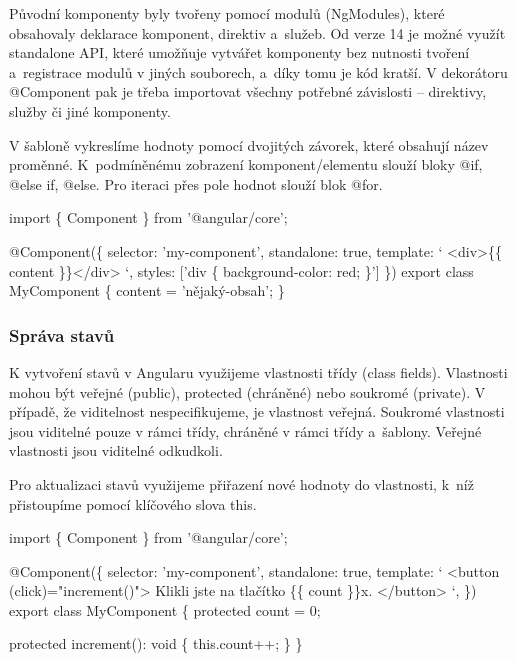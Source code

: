 Původní komponenty byly tvořeny pomocí modulů (NgModules), které obsahovaly deklarace komponent, direktiv a~služeb. 
Od verze 14 je možné využít standalone API, které umožňuje vytvářet komponenty bez nutnosti tvoření a~registrace modulů v jiných souborech, a~díky tomu je kód kratší. 
V dekorátoru @Component pak je třeba importovat všechny potřebné závislosti -- direktivy, služby či jiné komponenty.\cite{angulardev,learningangular}

V šabloně vykreslíme hodnoty pomocí dvojitých závorek, které obsahují název proměnné. K~podmíněnému zobrazení komponent/elementu slouží bloky @if, @else if, @else. 
Pro iteraci přes pole hodnot slouží blok @for.\cite{angulardev}

\begin{prog}
import \{ Component \} from '@angular/core';

@Component(\{
  selector: 'my-component',
  standalone: true,
  template: `
    <div>\{\{ content \}\}</div>
  `,
  styles: ['div \{ background-color: red; \}']
\})
export class MyComponent \{
  content = 'nějaký-obsah';
\}
\end{prog}

\subsubsection{Správa stavů}

K vytvoření stavů v Angularu využijeme vlastnosti třídy (class fields). Vlastnosti mohou být veřejné (public), protected (chráněné) nebo soukromé (private). 
V případě, že viditelnost nespecifikujeme, je vlastnost veřejná. Soukromé vlastnosti jsou viditelné pouze v rámci třídy, chráněné v rámci třídy a~šablony. 
Veřejné vlastnosti jsou viditelné odkudkoli.\cite{angulardev,learningangular}

Pro aktualizaci stavů využijeme přiřazení nové hodnoty do vlastnosti, k~níž přistoupíme pomocí klíčového slova this.\cite{angulardev}

\begin{prog}
import \{ Component \} from '@angular/core';

@Component(\{
  selector: 'my-component',
  standalone: true,
  template: `
    <button (click)="increment()">
      Klikli jste na tlačítko \{\{ count \}\}x.
    </button>
  `,
\})
export class MyComponent \{
  protected count = 0;

  protected increment(): void \{
    this.count++;
  \}
\}
\end{prog}

